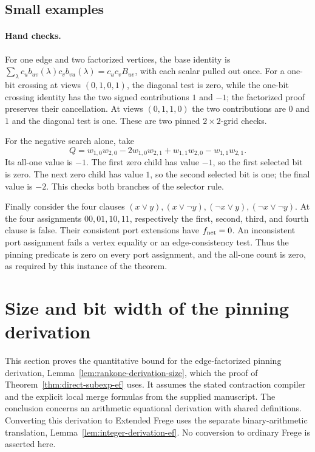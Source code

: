 \documentclass[11pt]{article}
\theoremstyle{definition}
\theoremstyle{remark}
\begin{document}
\subsection{Small examples}

\paragraph{Hand checks.}
For one edge and two factorized vertices, the base identity is
$\sum_\lambda c_ub_{uv}(\lambda)c_vb_{vu}(\lambda)
=c_uc_vB_{uv}$, with each scalar pulled out once. For a one-bit
crossing at views $(0,1,0,1)$, the diagonal test is zero, while the
one-bit crossing identity has the two signed contributions $1$ and
$-1$; the factorized proof preserves their cancellation. At views
$(0,1,1,0)$ the two contributions are $0$ and $1$ and the diagonal
test is one. These are two pinned $2\times2$-grid checks.

For the negative search alone, take
\[
 Q=w_{1,0}w_{2,0}-2w_{1,0}w_{2,1}
      +w_{1,1}w_{2,0}-w_{1,1}w_{2,1}.
\]
Its all-one value is $-1$. The first zero child has value $-1$,
so the first selected bit is zero. The next zero child has value
$1$, so the second selected bit is one; the final value is $-2$.
This checks both branches of the selector rule.

Finally consider the four clauses
$(x\lor y),(x\lor\neg y),(\neg x\lor y),(\neg x\lor\neg y)$.
At the four assignments $00,01,10,11$, respectively the first,
second, third, and fourth clause is false. Their consistent port
extensions have $f_{\rm net}=0$. An inconsistent port assignment
fails a vertex equality or an edge-consistency test. Thus the
pinning predicate is zero on every port assignment, and the
all-one count is zero, as required by this instance of the theorem.


\section{Size and bit width of the pinning derivation}
\label{sec:rankone-size-audit}

This section proves the quantitative bound for the edge-factorized
pinning derivation, Lemma~\ref{lem:rankone-derivation-size}, which
the proof of Theorem~\ref{thm:direct-subexp-ef} uses. It assumes the
stated contraction compiler and the explicit local merge formulas
from the supplied manuscript. The conclusion concerns an arithmetic
equational derivation with shared definitions. Converting this
derivation to Extended Frege uses the separate binary-arithmetic
translation, Lemma~\ref{lem:integer-derivation-ef}. No conversion to
ordinary Frege is asserted here.
\end{document}
